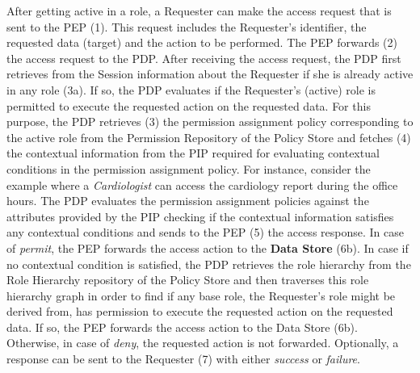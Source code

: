 \documentclass[final,5p,times,twocolumn]{elsarticle}
\begin{document}
After getting active in a role, a Requester can make the access request that is sent to the PEP (1). This request includes the Requester's identifier, the requested data (target) and the action to be performed. The PEP forwards (2) the access request to the PDP. After receiving the access request, the PDP first retrieves from the Session information about the Requester if she is already active in any role (3a). If so, the PDP evaluates if the Requester's (active) role is permitted to execute the requested action on the requested data. For this purpose, the PDP retrieves (3) the permission assignment policy corresponding to the active role from the Permission Repository of the Policy Store and fetches (4) the contextual information from the PIP required for evaluating contextual conditions in the permission assignment policy. For instance, consider the example where a \emph{Cardiologist} can access the cardiology report during the office hours. The PDP evaluates the permission assignment policies against the attributes provided by the PIP checking if the contextual information satisfies any contextual conditions and sends to the PEP (5) the access response. In case of \emph{permit}, the PEP forwards the access action to the \textbf{Data Store} (6b). In case if no contextual condition is satisfied, the PDP retrieves the role hierarchy from the Role Hierarchy repository of the Policy Store and then traverses this role hierarchy graph in order to find if any base role, the Requester's role might be derived from, has permission to execute the requested action on the requested data. If so, the PEP forwards the access action to the Data Store (6b). Otherwise, in case of \emph{deny}, the requested action is not forwarded. Optionally, a response can be sent to the Requester (7) with either \emph{success} or \emph{failure}.
\end{document}
